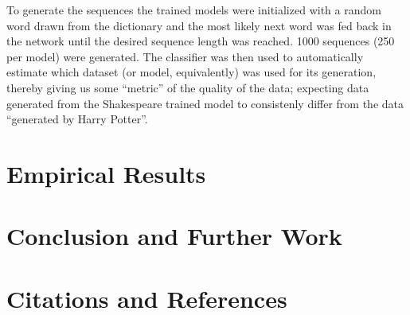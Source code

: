 \documentclass{article}
\begin{document}
To generate the sequences the trained models were initialized with a random word
drawn from the dictionary and the most likely next word was fed back in the network
until the desired sequence length was reached. 1000 sequences (250 per model) were
generated. The classifier was then used to automatically estimate which
dataset (or model, equivalently) was used for its generation, thereby giving us
some ``metric'' of the quality of the data; expecting data generated from the
Shakespeare trained model to consistenly differ from the data ``generated by
Harry Potter''.

\section{Empirical Results}
\section{Conclusion and Further Work}
\section{Citations and References} 



\end{document}
